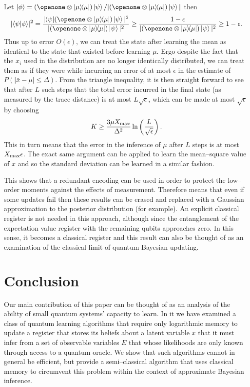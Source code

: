 \documentclass[aps,amsmath,onecolumn,amssymb,notitlepage]{revtex4-1}
\begin{document}
Let $\ket{\phi} = (\openone \otimes \ketbra{\mu}{\mu}) \ket{\psi} / |(\openone \otimes \ketbra{\mu}{\mu}) \ket{\psi}|$ then
\begin{equation}
|\braket{\psi}{\phi}|^2 = \frac{|\bra{\psi} (\openone \otimes \ketbra{\mu}{\mu}) \ket{\psi}|^2}{|(\openone \otimes \ketbra{\mu}{\mu}) \ket{\psi}|^2} \ge \frac{1-\epsilon}{|(\openone \otimes \ketbra{\mu}{\mu}) \ket{\psi}|^2} \ge 1-\epsilon.
\end{equation}
Thus up to error $O(\epsilon)$, we can treat the state after learning the mean as identical to the state that existed before learning $\mu$.  Ergo despite the fact that the $x_i$ used in the distribution are no longer identically distributed, we can treat them as if they were while incurring an error of at most $\epsilon$ in the estimate of $P(|\bar{x} - \mu|\le \Delta)$.  
From the triangle inequality, it is then straight forward to see that after $L$ such steps that the total error incurred in the final state (as measured by the trace distance) is at most $L\sqrt{\epsilon}$, which can be made at most $\sqrt{\epsilon}$ by choosing 
\begin{equation}
K\ge \frac{3\mu X_{\rm max}}{\Delta^2}\ln\left(\frac{L}{\sqrt{\epsilon}} \right).
\end{equation}
This in turn means that the error in the inference of $\mu$ after $L$ steps is at most $X_{\rm max} \epsilon$.  The exact same argument can be applied to learn the mean--square value of $x$ and so the standard deviation can be learned in a similar fashion.

This shows that a redundant encoding can be used in order to protect the low--order moments against the effects of measurement.  Therefore means that even if some updates fail then these results can be erased and replaced with a Gaussian approximation to the posterior distribution (for example).  An explicit classical register is not needed in this approach, although since the entanglement of the expectation value register with the remaining qubits approaches zero.  In this sense, it becomes a classical register and this result can also be thought of as an examination of the classical limit of quantum Bayesian updating.


\section{Conclusion}
Our main contribution of this paper can be thought of as an analysis of the ability of small quantum systems' capacity to learn.  In it we have examined a class of quantum learning algorithms that require only logarithmic memory to update a register that stores its beliefs about a latent variable $x$ that it must infer from a set of observable variables $E$ that whose likelihoods are only known through access to a quantum oracle.  We show that such algorithms cannot in general be efficient, but provide a semi--classical algorithm that uses classical memory to circumvent this problem within the context of approximate Bayesian inference.
\end{document}
